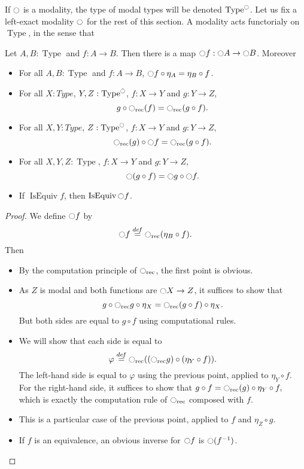 \documentclass[notfinal]{jfrarticle}
\DeclareMathOperator{\Type}{Type}
\DeclareMathOperator{\IsEquiv}{IsEquiv}
\newcommand \defeq {\overset{de\hspace{-0.2ex}f}{=}}
\newcommand{\modal}{\ensuremath{\ocircle}}
\begin{document}
If $\modal$ is a modality, the type of modal types will be denoted
$\Type^\modal$. Let us fix a left-exact modality $\modal$ for the rest
of this section. A modality acts functorialy on $\Type$, in the sense
that

\begin{lem}
  Let $A,B:\Type$ and $f:A\to B$. Then there is a map $\modal f:\modal
  A \to \modal B$. Moreover
  \begin{itemize}
  \item For all $A,B:\Type$ and $f:A\to B$, $\modal f \circ \eta_A = \eta_B \circ f$.
  \item For all $X:Type$, $Y,Z:\Type^\modal$, $f:X\to Y$ and $g:Y\to
    Z$, 
    \[g \circ \modal_{\text{rec}}(f) = \modal_{\text{rec}} (g\circ
    f).\]
  \item For all $X,Y:Type$, $Z:\Type^\modal$, $f:X\to Y$ and $g:Y\to
    Z$, \[\modal_{\text{rec}}(g) \circ \modal f = \modal_{\text{rec}}
    (g\circ f).\]
  \item For all $X,Y,Z:\Type$, $f:X\to Y$ and $g:Y\to Z$, 
    \[\modal (g \circ f) = \modal g \circ \modal f.\]
  \item If $\IsEquiv f$, then $\IsEquiv \modal f$.
  \end{itemize}
\end{lem}
\begin{proof}
  We define $\modal f$ by
  \[ \modal f \defeq \modal_{\text{rec}}(\eta_B \circ f).\]
  Then
  \begin{itemize}
  \item By the computation principle of $\modal_{\text{rec}}$, the
    first point is obvious.
  \item As $Z$ is modal and both functions are $\modal X\to Z$, it suffices to show that 
    \[g \circ \modal_{\text{rec}} g \circ \eta_X = \modal_{\text{rec}} (g\circ
    f) \circ \eta_X.\]
    But both sides are equal to $g\circ f$ using computational rules.
  \item We will show that each side is equal to
    \[\varphi \defeq \modal_{\text{rec}} ((\modal_{\text{rec}} g) \circ (\eta_Y
    \circ f)).\]
    The left-hand side is equal to $\varphi$ using the previous point,
    applied to $\eta_Y \circ f$.
    For the right-hand side, it suffices to show that
    $g\circ f = \modal_{\text{rec}}(g) \circ \eta_Y \circ f,$
    which is exactly the computation rule of $\modal_{\text{rec}}$
    composed with $f$.
  \item This is a particular case of the previous point, applied to
    $f$ and $\eta_Z \circ g$.
  \item If $f$ is an equivalence, an obvious inverse for $\modal f$ is
    $\modal (f^{-1})$.

  \end{itemize}
\end{proof}
\end{document}
